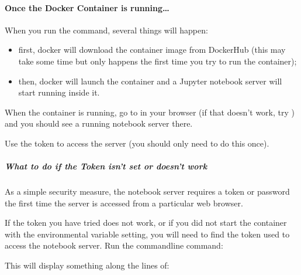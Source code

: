 \documentclass[letterpaper,10pt,english]{sphinxmanual}
\let\sphinxpxdimen\pdfpxdimen\else\newdimen\sphinxpxdimen
\begin{document}
\paragraph{Once the Docker Container is running…}
\label{\detokenize{content/00_READ_ME_FIRST/Section_00_05_Accessing_RoboLab:Once-the-Docker-Container-is-running_u2026}}
When you run the  command, several things will happen:
\begin{itemize}
\item {} 
first, docker will download the container image from DockerHub (this may take some time but only happens the first time you try to run the container);

\item {} 
then, docker will launch the container and a Jupyter notebook server will start running inside it.

\end{itemize}

When the container is running, go to  in your browser (if that doesn’t work, try ) and you should see a running notebook server there.

Use the token  to access the server (you should only need to do this once).

\noindent\sphinxincludegraphics[width=1786\sphinxpxdimen,height=1576\sphinxpxdimen]{{Jupyter_Notebook_token}.png}


\subparagraph{What to do if the Token isn’t set or doesn’t work}
\label{\detokenize{content/00_READ_ME_FIRST/Section_00_05_Accessing_RoboLab:What-to-do-if-the-Token-isn_u2019t-set-or-doesn_u2019t-work}}
As a simple security measure, the notebook server requires a token or password the first time the server is accessed from a particular web browser.

If the token you have tried does not work, or if you did not start the container with the  environmental variable setting, you will need to find the token used to access the notebook server. Run the command\sphinxhyphen{}line command:


This will display something along the lines of:

\end{document}
